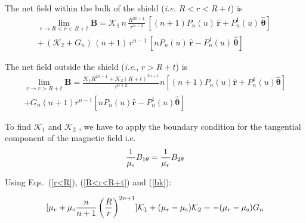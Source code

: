 The net field  within the bulk of the shield (\textit{i.e.} $R<r<R+t$)  is 
\begin{multline}\label{R<r<R+t}
\lim_{r\to R<r<R+t}\bm B= \mathcal{K}_1 \, n\, \frac{R^{2n+1}}{r^{n+2}} \,[(n+1) P_n(u) \, \bm{\hat{r}} +  P_n^1(u)  \, \bm{\hat{\theta}} ] \, \\ +\, (\mathcal{K}_2+G_n) \, (n+1)\, r^{n-1} \, [n P_n(u) \, \bm{\hat{r}} -  P_n^1(u)  \, \bm{\hat{\theta}} ]
\end{multline}

The net field  outside the shield (\textit{i.e.}, $r>R+t$) is
\begin{multline}\label{r>R}
\lim_{r\to r>R+t}\bm B=\frac{\mathcal{K}_1R^{2n+1} + \mathcal{K}_2 (R+t)^{2n+1} }{r^{n+2}} n [(n+1) P_n(u) \bm{\hat{r}} +  P_n^1(u)  \bm{\hat{\theta}} ]  \\+ G_n (n+1) r^{n-1} [n P_n(u) \bm{\hat{r}} - P_n^1(u)  \bm{\hat{\theta}} ]
\end{multline}

To find \(\mathcal{K}_1\) and \(\mathcal{K}_2\) , we have to apply the boundary condition for the tangential component of the magnetic field i.e.
\begin{equation}\label{bk}
\frac{1}{\mu_{\scriptscriptstyle 0}} B_{1\theta}=  \frac{1}{\mu_r} B_{2\theta}  
\end{equation}

Using Eqs.~(\ref{r<R}), (\ref{R<r<R+t}) and (\ref{bk}):




$$[\mu_r+\mu_{\scriptscriptstyle 0}\frac{n}{n+1}\left(\dfrac{R}{r}\right)^{2n+1}]\mathcal{K}_1 +(\mu_r-\mu_{\scriptscriptstyle 0})\mathcal{K}_2=-(\mu_r-\mu_{\scriptscriptstyle 0})G_n$$

